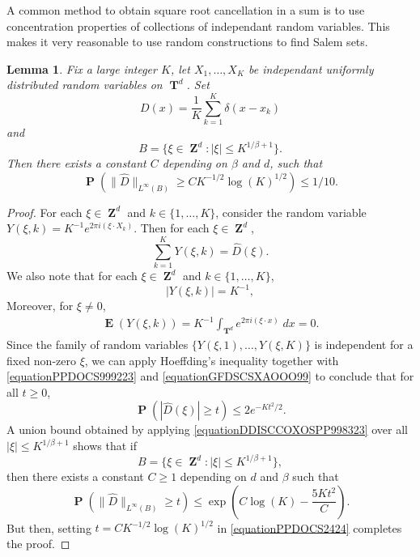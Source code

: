 \documentclass[12pt,reqno]{article}
\numberwithin{equation}{section}
\DeclareMathOperator{\ZZ}{\mathbf{Z}}
\DeclareMathOperator{\TT}{\mathbf{T}}
\newtheorem{lemma}{Lemma}
\DeclareMathOperator{\EE}{\mathbf{E}}
\DeclareMathOperator{\PP}{\mathbf{P}}
\begin{document}
A common method to obtain square root cancellation in a sum is to use concentration properties of collections of independant random variables. This makes it very reasonable to use random constructions to find Salem sets.

\begin{lemma} \label{LemmaGISCICS1}
    Fix a large integer $K$, let $X_1, \dots, X_K$ be independant uniformly distributed random variables on $\TT^d$. Set
    \[ D(x) = \frac{1}{K} \sum_{k = 1}^K \delta(x - x_k) \]
    and
    \[ B = \{ \xi \in \ZZ^d: |\xi| \leq K^{1/\beta + 1} \}. \]
    Then there exists a constant $C$ depending on $\beta$ and $d$, such that
    \[ \PP \left( \| \widehat{D} \|_{L^\infty(B)} \geq C K^{-1/2} \log(K)^{1/2} \right) \leq 1/10. \]
\end{lemma}
\begin{proof}
    For each $\xi \in \ZZ^d$ and $k \in \{ 1, \dots, K \}$, consider the random variable $Y(\xi,k) = K^{-1} e^{2 \pi i (\xi \cdot X_k)}$. Then for each $\xi \in \ZZ^d$,
    \begin{equation} \label{equationPPDOCS999223}
        \sum_{k = 1}^K Y(\xi,k) = \widehat{D}(\xi).
    \end{equation}
    We also note that for each $\xi \in \ZZ^d$ and $k \in \{ 1, \dots, K \}$,
    \begin{equation} \label{equationGFDSCSXAOOO99}
        |Y(\xi,k)| = K^{-1},
    \end{equation}
    Moreover, for $\xi \neq 0$,
    \begin{equation} \label{equationDOIJWIJCCCCC5555322}
    \begin{split}
        \EE(Y(\xi,k)) = K^{-1} \int_{\TT^d} e^{2 \pi i (\xi \cdot x)}\; dx = 0.
    \end{split}
    \end{equation}
    Since the family of random variables $\{ Y(\xi,1), \dots, Y(\xi,K) \}$ is independent for a fixed non-zero $\xi$, we can apply Hoeffding's inequality together with \eqref{equationPPDOCS999223} and \eqref{equationGFDSCSXAOOO99} to conclude that for all $t \geq 0$,
    \begin{equation} \label{equationDDISCCOXOSPP998323}
        \PP \left( |\widehat{D}(\xi)| \geq t \right) \leq 2 e^{-Kt^2/2}.
    \end{equation}
    A union bound obtained by applying \eqref{equationDDISCCOXOSPP998323} over all $|\xi| \leq K^{1/\beta+1}$ shows that if
    \[ B = \{ \xi \in \ZZ^d : |\xi| \leq K^{1/\beta + 1} \}, \]
    then there exists a constant $C \geq 1$ depending on $d$ and $\beta$ such that
    \begin{equation} \label{equationPPDOCS2424}
        \PP \left( \| \widehat{D} \|_{L^\infty(B)} \geq t \right) \leq \exp \left( C \log(K) - \frac{5K t^2}{C} \right).
    \end{equation}
    But then, setting $t = CK^{-1/2} \log(K)^{1/2}$ in \eqref{equationPPDOCS2424} completes the proof.
\end{proof}
\end{document}
